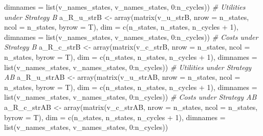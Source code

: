 \documentclass[
]{article}
\newenvironment{Shaded}{\begin{snugshade}}{\end{snugshade}}
\newcommand{\AttributeTok}[1]{\textcolor[rgb]{0.77,0.63,0.00}{#1}}
\newcommand{\CommentTok}[1]{\textcolor[rgb]{0.56,0.35,0.01}{\textit{#1}}}
\newcommand{\DecValTok}[1]{\textcolor[rgb]{0.00,0.00,0.81}{#1}}
\newcommand{\FunctionTok}[1]{\textcolor[rgb]{0.00,0.00,0.00}{#1}}
\newcommand{\NormalTok}[1]{#1}
\newcommand{\OtherTok}[1]{\textcolor[rgb]{0.56,0.35,0.01}{#1}}
\newcommand{\SpecialCharTok}[1]{\textcolor[rgb]{0.00,0.00,0.00}{#1}}
\begin{document}
\begin{Shaded}
\begin{Highlighting}[]
                  \AttributeTok{dimnames =} \FunctionTok{list}\NormalTok{(v\_names\_states, v\_names\_states, }\DecValTok{0}\SpecialCharTok{:}\NormalTok{n\_cycles))}
\CommentTok{\# Utilities under Strategy B}
\NormalTok{a\_R\_u\_strB }\OtherTok{\textless{}{-}}  \FunctionTok{array}\NormalTok{(}\FunctionTok{matrix}\NormalTok{(v\_u\_strB, }\AttributeTok{nrow =}\NormalTok{ n\_states, }\AttributeTok{ncol =}\NormalTok{ n\_states, }\AttributeTok{byrow =}\NormalTok{ T), }
                  \AttributeTok{dim =} \FunctionTok{c}\NormalTok{(n\_states, n\_states, n\_cycles }\SpecialCharTok{+} \DecValTok{1}\NormalTok{),}
                  \AttributeTok{dimnames =} \FunctionTok{list}\NormalTok{(v\_names\_states, v\_names\_states, }\DecValTok{0}\SpecialCharTok{:}\NormalTok{n\_cycles))}
\CommentTok{\# Costs under Strategy B}
\NormalTok{a\_R\_c\_strB }\OtherTok{\textless{}{-}} \FunctionTok{array}\NormalTok{(}\FunctionTok{matrix}\NormalTok{(v\_c\_strB, }\AttributeTok{nrow =}\NormalTok{ n\_states, }\AttributeTok{ncol =}\NormalTok{ n\_states, }\AttributeTok{byrow =}\NormalTok{ T), }
                  \AttributeTok{dim =} \FunctionTok{c}\NormalTok{(n\_states, n\_states, n\_cycles }\SpecialCharTok{+} \DecValTok{1}\NormalTok{),}
                  \AttributeTok{dimnames =} \FunctionTok{list}\NormalTok{(v\_names\_states, v\_names\_states, }\DecValTok{0}\SpecialCharTok{:}\NormalTok{n\_cycles))}
\CommentTok{\# Utilities under Strategy AB}
\NormalTok{a\_R\_u\_strAB }\OtherTok{\textless{}{-}}  \FunctionTok{array}\NormalTok{(}\FunctionTok{matrix}\NormalTok{(v\_u\_strAB, }\AttributeTok{nrow =}\NormalTok{ n\_states, }\AttributeTok{ncol =}\NormalTok{ n\_states, }\AttributeTok{byrow =}\NormalTok{ T), }
                  \AttributeTok{dim =} \FunctionTok{c}\NormalTok{(n\_states, n\_states, n\_cycles }\SpecialCharTok{+} \DecValTok{1}\NormalTok{),}
                  \AttributeTok{dimnames =} \FunctionTok{list}\NormalTok{(v\_names\_states, v\_names\_states, }\DecValTok{0}\SpecialCharTok{:}\NormalTok{n\_cycles))}
\CommentTok{\# Costs under Strategy AB}
\NormalTok{a\_R\_c\_strAB }\OtherTok{\textless{}{-}} \FunctionTok{array}\NormalTok{(}\FunctionTok{matrix}\NormalTok{(v\_c\_strAB, }\AttributeTok{nrow =}\NormalTok{ n\_states, }\AttributeTok{ncol =}\NormalTok{ n\_states, }\AttributeTok{byrow =}\NormalTok{ T), }
                  \AttributeTok{dim =} \FunctionTok{c}\NormalTok{(n\_states, n\_states, n\_cycles }\SpecialCharTok{+} \DecValTok{1}\NormalTok{),}
                  \AttributeTok{dimnames =} \FunctionTok{list}\NormalTok{(v\_names\_states, v\_names\_states, }\DecValTok{0}\SpecialCharTok{:}\NormalTok{n\_cycles))}
\end{Highlighting}
\end{Shaded}
\end{document}

